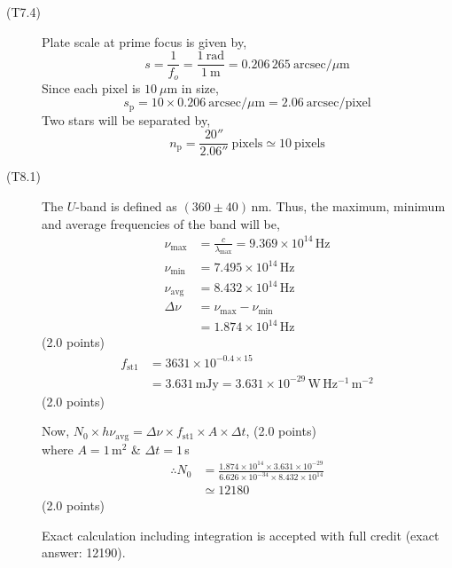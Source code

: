 \begin{description}
\item[(T7.4)] Plate scale at prime focus is given by,
\[
s = \frac{1}{f_o} = \frac{1\ \mathrm{rad}}{1\ \mathrm{m}}
 = 0.206\,265\ \mathrm{arcsec}/\mu\mathrm{m} \tag*{(2.0)}
\]
Since each pixel is $10\ \mu$m in size,
\[
s_{\mathrm{p}} = 10 \times 0.206\ \mathrm{arcsec}/\mu\mathrm{m}
 = 2.06\ \mathrm{arcsec/pixel} \tag*{(2.0)}
\]
Two stars will be separated by,
\[
n_{\mathrm{p}} = \frac{20''}{2.06''}\ \mathrm{pixels}
 \simeq 10\ \mathrm{pixels} \tag*{(2.0)}
\]
\end{description}

\begin{description}
\item[(T8.1)]
The $U$-band is defined as $(360 \pm 40)$\,nm. Thus, the maximum, minimum and
average frequencies of the band will be,
\begin{align*}
\nu_{\mathrm{max}} &= \frac{c}{\lambda_{\mathrm{max}}}
  = 9.369 \times 10^{14}\,\mathrm{Hz} \\
\nu_{\mathrm{min}} &= 7.495 \times 10^{14}\,\mathrm{Hz} \\
\nu_{\mathrm{avg}} &= 8.432 \times 10^{14}\,\mathrm{Hz} \\
\Delta\nu &= \nu_{\mathrm{max}} - \nu_{\mathrm{min}} \\
  &= 1.874 \times 10^{14}\,\mathrm{Hz}
\end{align*}
\hfill(2.0 points)
\begin{align*}
f_{\mathrm{st1}} &= 3631 \times 10^{-0.4 \times 15} \\
  &= 3.631\,\mathrm{mJy}
   = 3.631 \times 10^{-29}\,\mathrm{W\,Hz^{-1}\,m^{-2}}
\end{align*}
\hfill(2.0 points)

Now, $N_0 \times h\nu_{\mathrm{avg}} = \Delta\nu \times f_{\mathrm{st1}}
\times A \times \Delta t$, \hfill(2.0 points)\\
where $A = 1\,\mathrm{m}^2$ \& $\Delta t = 1$\,s
\begin{align*}
\therefore N_0 &= \frac{1.874 \times 10^{14} \times 3.631 \times 10^{-29}}
  {6.626 \times 10^{-34} \times 8.432 \times 10^{14}} \\
  &\simeq 12180
\end{align*}
\hfill(2.0 points)

Exact calculation including integration is accepted with full credit (exact
answer: 12190).


\end{description}
